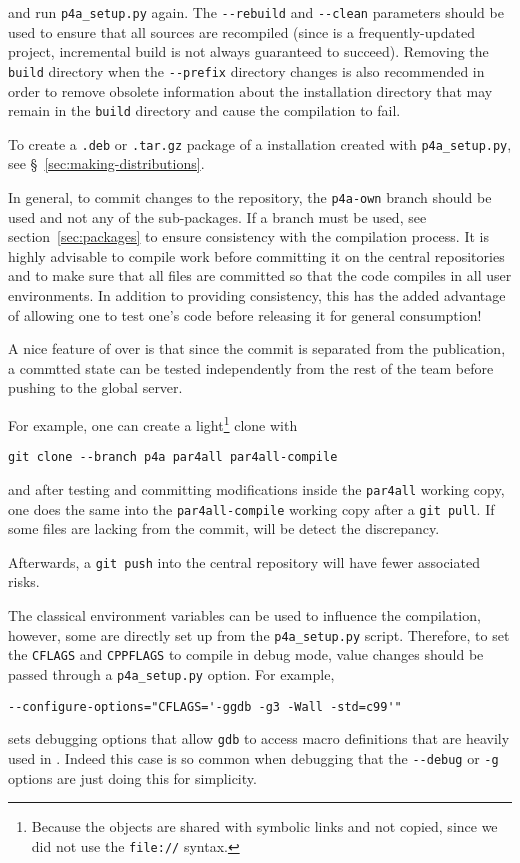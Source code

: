 \documentclass[a4paper]{article}
\begin{document}
and run \verb|p4a_setup.py| again. The
\verb|--rebuild| and \verb|--clean| parameters should be used to
ensure that all sources are recompiled
(since \Apips is a frequently-updated project, incremental build is
not always guaranteed to succeed). Removing the \texttt{build}
directory
when the \verb|--prefix| directory changes is also recommended
in order to remove obsolete
information about the installation directory that may remain in
the \texttt{build} directory and cause the compilation to fail.

To create a \texttt{.deb} or \texttt{.tar.gz} package of a \Apfa installation
created with \verb|p4a_setup.py|, see \S~\ref{sec:making-distributions}.

In general, to commit changes to the \Agit repository, the
\texttt{p4a-own} branch should be used and not any of the \Apfa
sub-packages. If a branch must be used, see section~\ref{sec:packages}
to ensure consistency with the \Apfa compilation process. It is highly
advisable to compile work before
committing it on the central repositories and to make sure that all
files are committed so that the code compiles in all user
environments. In addition to providing
consistency, this has the added advantage of
allowing one to test one's code before releasing it for general
consumption! \smiley

A nice feature of \Agit over \Asvn is that since the commit is separated from
the publication, a commtted state can be tested independently from the
rest of the team before pushing to the global server.

For example, one can create a light\footnote{Because the objects are
  shared with symbolic links and not copied, since we did not use the
  \texttt{file://} syntax.} clone with
\begin{verbatim}
git clone --branch p4a par4all par4all-compile
\end{verbatim}
and after testing and committing modifications inside the
\texttt{par4all} working copy, one does the same into the
\texttt{par4all-compile} working copy after a \texttt{git pull}.
If some files are lacking from the commit, \Agit will be detect the discrepancy.

Afterwards, a \texttt{git push} into the central \Apfa
repository will have fewer associated risks.

The classical \Aautotools environment variables can be used to influence
the compilation, however, some are directly set up from the \verb|p4a_setup.py|
script. Therefore, to set the \texttt{CFLAGS} and \texttt{CPPFLAGS}
to compile \Apfa in debug mode, value changes should be passed through
a \verb|p4a_setup.py| option. For example,
\begin{verbatim}
--configure-options="CFLAGS='-ggdb -g3 -Wall -std=c99'"
\end{verbatim}
sets debugging options that allow \texttt{gdb} to access macro
definitions that are heavily used in \Apips. Indeed this case is so common
when debugging \Apfa that the \verb|--debug| or \verb|-g| options are just
doing this for simplicity.
\end{document}
